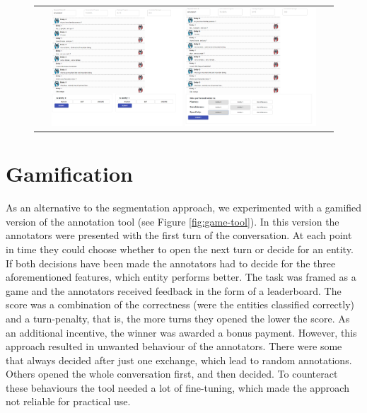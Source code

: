 \documentclass[11pt,a4paper]{article}
\begin{document}
\label{sec:appendix}
\begin{figure}[!ht]
	\begin{center}
        \begin{tabular}{@{}c@{}}
		\includegraphics[width=0.45\textwidth]{figures/AnnotationTool1.png} 
		\includegraphics[width=0.45\textwidth]{figures/AnnotationTool2.png}
       \end{tabular}
	\end{center}\vspace{-3mm}
\label{fig:tool}
\end{figure}

\section{Gamification}
\label{sec:appendix_gamification}
As an alternative to the segmentation approach, we experimented with a gamified version of the annotation tool (see Figure \ref{fig:game-tool}). In this version the annotators were presented with the first turn of the conversation. At each point in time they could choose whether to open the next turn or decide for an entity. If both decisions have been made the annotators had to decide for the three aforementioned features, which entity performs better. 
The task was framed as a game and the annotators received feedback in the form of a leaderboard. The score was a combination of the correctness (were the entities classified correctly) and a turn-penalty, that is, the more turns they opened the lower the score. As an additional incentive, the winner was awarded a bonus payment. 
However, this approach resulted in unwanted behaviour of the annotators. There were some that always decided after just one exchange, which lead to random annotations. Others opened the whole conversation first, and then decided. To counteract these behaviours the tool needed a lot of fine-tuning, which made the approach not reliable for practical use.
\end{document}
